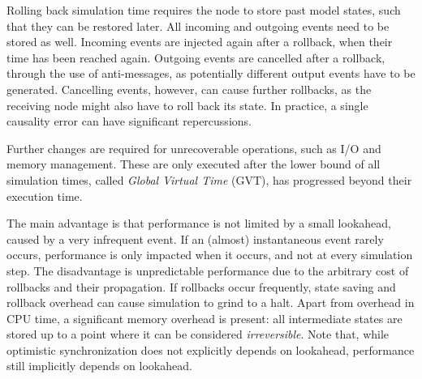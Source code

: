 Rolling back simulation time requires the node to store past model states, such that they can be restored later.
All incoming and outgoing events need to be stored as well.
Incoming events are injected again after a rollback, when their time has been reached again.
Outgoing events are cancelled after a rollback, through the use of anti-messages, as potentially different output events have to be generated.
Cancelling events, however, can cause further rollbacks, as the receiving node might also have to roll back its state.
In practice, a single causality error can have significant repercussions.

Further changes are required for unrecoverable operations, such as I/O and memory management.
These are only executed after the lower bound of all simulation times, called \textit{Global Virtual Time} (GVT), has progressed beyond their execution time.

The main advantage is that performance is not limited by a small lookahead, caused by a very infrequent event.
If an (almost) instantaneous event rarely occurs, performance is only impacted when it occurs, and not at every simulation step.
The disadvantage is unpredictable performance due to the arbitrary cost of rollbacks and their propagation.
If rollbacks occur frequently, state saving and rollback overhead can cause simulation to grind to a halt.
Apart from overhead in CPU time, a significant memory overhead is present: all intermediate states are stored up to a point where it can be considered \textit{irreversible}.
Note that, while optimistic synchronization does not explicitly depends on lookahead, performance still implicitly depends on lookahead.
